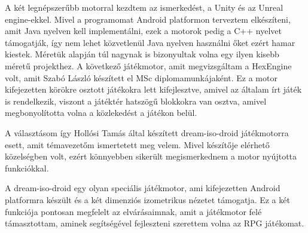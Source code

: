 A két legnépszerűbb motorral kezdtem az ismerkedést, a Unity és az Unreal engine-ekkel. 
Mivel a programomat Android platformon terveztem elkészíteni, amit Java nyelven kell implementálni, ezek a motorok pedig a C++ nyelvet támogatják, így nem lehet közvetlenül Java nyelven használni őket ezért hamar kiestek. 
Méretük alapján túl nagynak is bizonyultak volna egy ilyen kisebb méretű projekthez. 
A következő játékmotor, amit megvizsgáltam a HexEngine volt, amit Szabó László készített el MSc diplomamunkájaként. 
Ez a motor kifejezetten körökre osztott játékokra lett kifejlesztve, amivel az általam írt játék is rendelkezik, viszont a játéktér hatszögű blokkokra van osztva, amivel megbonyolította volna a közlekedést a játékon belül.

A választásom így Hollósi Tamás által készített dream-iso-droid játékmotorra esett, amit témavezetőm ismertetett meg velem. 
Mivel készítője elérhető közelségben volt, ezért könnyebben sikerült megismerkednem a motor nyújtotta funkciókkal.


A dream-iso-droid egy olyan speciális játékmotor, ami kifejezetten Android platformra készült és a két dimenziós izometrikus nézetet támogatja. 
Ez a két funkciója pontosan megfelelt az elvárásaimnak, amit a játékmotor felé támasztottam, aminek segítségével fejleszteni szerettem volna az RPG játékomat.




